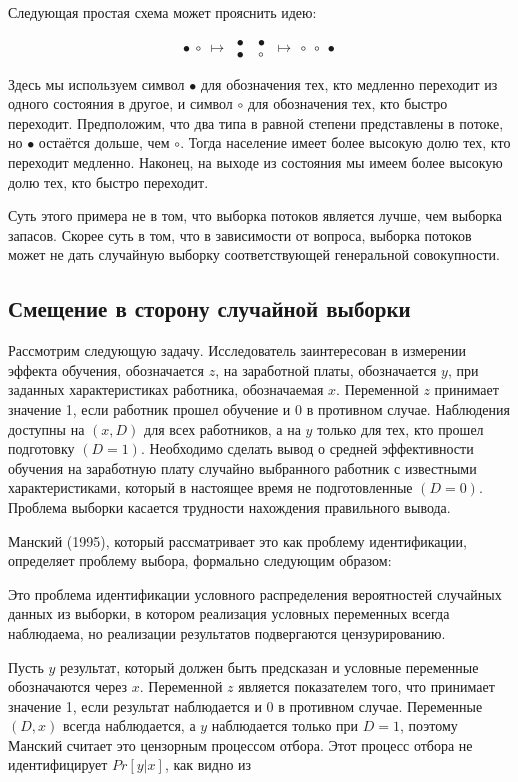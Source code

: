 Следующая простая схема может прояснить идею:

\[ \bullet \: \circ \: \longmapsto \: \begin{aligned} \bullet &\: \bullet \\ \bullet &\: \circ \end{aligned}  \: \longmapsto \: \circ \: \circ \: \bullet \]

Здесь мы используем символ $\bullet$ для обозначения тех, кто медленно переходит из одного состояния в другое, и символ $\circ$ для обозначения тех, кто быстро переходит. Предположим, что два типа в равной степени представлены в потоке, но $\bullet$ остаётся дольше, чем $\circ$. Тогда население имеет более высокую долю тех, кто переходит медленно. Наконец, на выходе из состояния мы имеем более высокую долю тех, кто быстро переходит. 


Суть этого примера не в том, что выборка потоков является лучше, чем выборка запасов. Скорее суть в том, что в зависимости от вопроса, выборка потоков может не дать случайную выборку соответствующей генеральной совокупности.



\subsection{Смещение в сторону случайной выборки}

Рассмотрим следующую задачу. Исследователь заинтересован в измерении эффекта обучения, обозначается $z$, на  заработной платы, обозначается $y$, при заданных характеристиках работника, обозначаемая $x$. Переменной $z$ принимает значение 1, если работник прошел обучение и 0 в противном случае. Наблюдения доступны на $(x, D)$ для всех работников, а на $y$ только для тех, кто прошел подготовку $(D = 1)$. Необходимо сделать вывод о средней эффективности обучения на заработную плату случайно выбранного работник с известными характеристиками, который в настоящее время не подготовленные $(D = 0)$. Проблема выборки касается трудности нахождения правильного вывода.


Манский (1995), который рассматривает это как проблему идентификации, определяет проблему выбора, формально следующим образом:


Это проблема идентификации условного распределения вероятностей случайных данных из выборки, в котором реализация условных переменных всегда наблюдаема, но реализации результатов подвергаются цензурированию.


Пусть $y$ результат, который должен быть предсказан и условные переменные обозначаются через $x$. Переменной $z$ является показателем того, что принимает значение 1, если результат наблюдается и 0 в противном случае. Переменные $(D, x)$ всегда наблюдается, а $y$ наблюдается только при $D = 1$, поэтому Манский считает это цензорным процессом отбора. Этот процесс отбора не идентифицирует $Pr[y|x]$, как видно из

